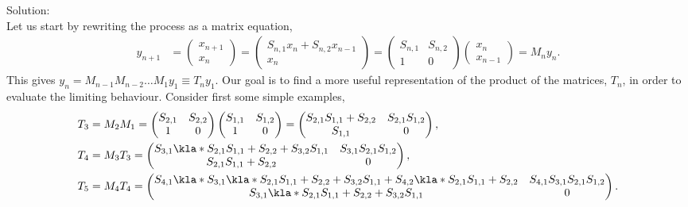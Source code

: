 \documentclass[english, parskip=full]{scrartcl}
\begin{document}
Solution:\\
Let us start by rewriting the process as a matrix equation,
\begin{align}
y_{n+1} &= \begin{pmatrix}
x_{n+1} \\ x_n
\end{pmatrix} = \begin{pmatrix}
S_{n,1} x_n + S_{n,2} x_{n-1} \\ x_n
\end{pmatrix} = \begin{pmatrix}
S_{n,1} & S_{n,2} \\ 1 & 0
\end{pmatrix} \begin{pmatrix}
x_n \\ x_{n-1}
\end{pmatrix} = M_n y_n.
\end{align}
This gives $y_n=M_{n-1} M_{n-2} \dots M_{1} y_1 \equiv T_n y_1$.
Our goal is to find a more useful representation of the product of the matrices, $T_n$, in order to evaluate the limiting behaviour.
Consider first some simple examples,
\begin{align}
T_3 &= M_2M_1 = \begin{pmatrix}
S_{2,1} & S_{2,2} \\ 1 & 0
\end{pmatrix} \begin{pmatrix}
S_{1,1} & S_{1,2} \\ 1 & 0
\end{pmatrix} = \begin{pmatrix}
S_{2,1}S_{1,1} + S_{2,2} & S_{2,1} S_{1,2} \\ S_{1,1} & 0
\end{pmatrix},\\
T_4 &= M_3T_3 = \begin{pmatrix}
S_{3,1} \kla*{S_{2,1}S_{1,1} + S_{2,2}} + S_{3,2} S_{1,1} & S_{3,1} S_{2,1} S_{1,2} \\ S_{2,1}S_{1,1} + S_{2,2} & 0
\end{pmatrix},\\
T_5 &= M_4T_4 = \begin{pmatrix}
S_{4,1} \kla*{S_{3,1} \kla*{S_{2,1}S_{1,1} + S_{2,2}} + S_{3,2} S_{1,1}} + S_{4,2} \kla*{S_{2,1}S_{1,1} + S_{2,2}} & S_{4,1} S_{3,1} S_{2,1} S_{1,2} \\ S_{3,1} \kla*{S_{2,1}S_{1,1} + S_{2,2}} + S_{3,2} S_{1,1} & 0
\end{pmatrix}.
\end{align}
\end{document}
